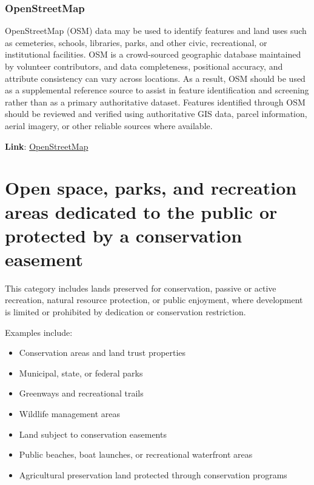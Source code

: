 \documentclass[
  letterpaper,
  DIV=11,
  numbers=noendperiod]{scrreprt}
\providecommand{\tightlist}{%
  \setlength{\itemsep}{0pt}\setlength{\parskip}{0pt}}
\begin{document}
\subsubsection{OpenStreetMap}\label{sec-openstreetmap}

OpenStreetMap (OSM) data may be used to identify features and land uses
such as cemeteries, schools, libraries, parks, and other civic,
recreational, or institutional facilities. OSM is a crowd-sourced
geographic database maintained by volunteer contributors, and data
completeness, positional accuracy, and attribute consistency can vary
across locations. As a result, OSM should be used as a supplemental
reference source to assist in feature identification and screening
rather than as a primary authoritative dataset. Features identified
through OSM should be reviewed and verified using authoritative GIS
data, parcel information, aerial imagery, or other reliable sources
where available.

\textbf{Link}: \href{https://www.openstreetmap.org/}{OpenStreetMap}

\section{Open space, parks, and recreation areas dedicated to the public
or protected by a conservation
easement}\label{open-space-parks-and-recreation-areas-dedicated-to-the-public-or-protected-by-a-conservation-easement}

This category includes lands preserved for conservation, passive or
active recreation, natural resource protection, or public enjoyment,
where development is limited or prohibited by dedication or conservation
restriction.

Examples include:

\begin{itemize}
\tightlist
\item
  Conservation areas and land trust properties
\item
  Municipal, state, or federal parks
\item
  Greenways and recreational trails
\item
  Wildlife management areas
\item
  Land subject to conservation easements
\item
  Public beaches, boat launches, or recreational waterfront areas
\item
  Agricultural preservation land protected through conservation programs
\end{itemize}
\end{document}
